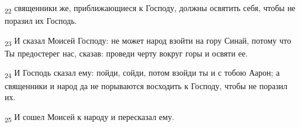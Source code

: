 \begin{tcolorbox}
\textsubscript{22} священники же, приближающиеся к Господу, должны освятить себя, чтобы не поразил их Господь.
\end{tcolorbox}
\begin{tcolorbox}
\textsubscript{23} И сказал Моисей Господу: не может народ взойти на гору Синай, потому что Ты предостерег нас, сказав: проведи черту вокруг горы и освяти ее.
\end{tcolorbox}
\begin{tcolorbox}
\textsubscript{24} И Господь сказал ему: пойди, сойди, потом взойди ты и с тобою Аарон; а священники и народ да не порываются восходить к Господу, чтобы не поразил их.
\end{tcolorbox}
\begin{tcolorbox}
\textsubscript{25} И сошел Моисей к народу и пересказал ему.
\end{tcolorbox}
